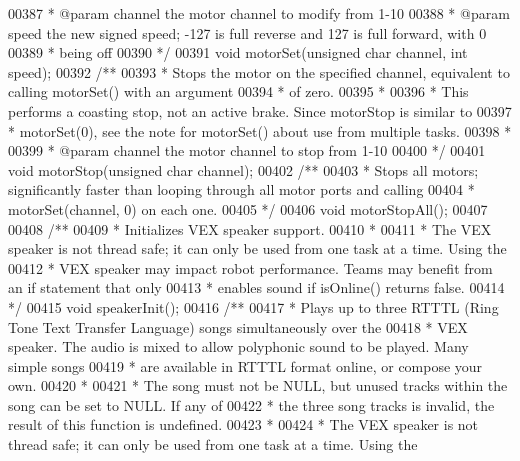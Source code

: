 \begin{DoxyCode}
00387 \textcolor{comment}{ * @param channel the motor channel to modify from 1-10}
00388 \textcolor{comment}{ * @param speed the new signed speed; -127 is full reverse and 127 is full forward, with 0}
00389 \textcolor{comment}{ * being off}
00390 \textcolor{comment}{ */}
00391 \textcolor{keywordtype}{void} motorSet(\textcolor{keywordtype}{unsigned} \textcolor{keywordtype}{char} channel, \textcolor{keywordtype}{int} speed);
00392 \textcolor{comment}{/**}
00393 \textcolor{comment}{ * Stops the motor on the specified channel, equivalent to calling motorSet() with an argument}
00394 \textcolor{comment}{ * of zero.}
00395 \textcolor{comment}{ *}
00396 \textcolor{comment}{ * This performs a coasting stop, not an active brake. Since motorStop is similar to}
00397 \textcolor{comment}{ * motorSet(0), see the note for motorSet() about use from multiple tasks.}
00398 \textcolor{comment}{ *}
00399 \textcolor{comment}{ * @param channel the motor channel to stop from 1-10}
00400 \textcolor{comment}{ */}
00401 \textcolor{keywordtype}{void} motorStop(\textcolor{keywordtype}{unsigned} \textcolor{keywordtype}{char} channel);
00402 \textcolor{comment}{/**}
00403 \textcolor{comment}{ * Stops all motors; significantly faster than looping through all motor ports and calling}
00404 \textcolor{comment}{ * motorSet(channel, 0) on each one.}
00405 \textcolor{comment}{ */}
00406 \textcolor{keywordtype}{void} motorStopAll();
00407 
00408 \textcolor{comment}{/**}
00409 \textcolor{comment}{ * Initializes VEX speaker support.}
00410 \textcolor{comment}{ *}
00411 \textcolor{comment}{ * The VEX speaker is not thread safe; it can only be used from one task at a time. Using the}
00412 \textcolor{comment}{ * VEX speaker may impact robot performance. Teams may benefit from an if statement that only}
00413 \textcolor{comment}{ * enables sound if isOnline() returns false.}
00414 \textcolor{comment}{ */}
00415 \textcolor{keywordtype}{void} speakerInit();
00416 \textcolor{comment}{/**}
00417 \textcolor{comment}{ * Plays up to three RTTTL (Ring Tone Text Transfer Language) songs simultaneously over the}
00418 \textcolor{comment}{ * VEX speaker. The audio is mixed to allow polyphonic sound to be played. Many simple songs}
00419 \textcolor{comment}{ * are available in RTTTL format online, or compose your own.}
00420 \textcolor{comment}{ *}
00421 \textcolor{comment}{ * The song must not be NULL, but unused tracks within the song can be set to NULL. If any of}
00422 \textcolor{comment}{ * the three song tracks is invalid, the result of this function is undefined.}
00423 \textcolor{comment}{ *}
00424 \textcolor{comment}{ * The VEX speaker is not thread safe; it can only be used from one task at a time. Using the}

\end{DoxyCode}
